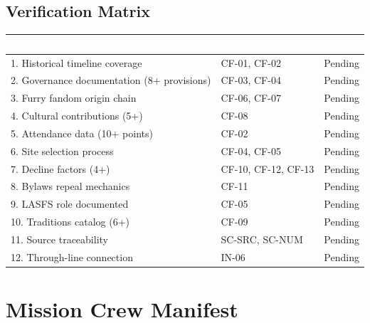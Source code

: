 \documentclass[11pt,letterpaper]{article}
\newcommand{\tableheader}[1]{\textbf{\sffamily\textcolor{white}{#1}}}
\begin{document}
\subsection{Verification Matrix}

\begin{center}
\begin{tabularx}{\textwidth}{XL{3.5cm}C{1.5cm}}
\toprule
{}
\tableheader{Success Criterion} & \tableheader{Test ID(s)} & \tableheader{Status} \\
. Historical timeline coverage & CF-01, CF-02 & Pending \\
2. Governance documentation (8+ provisions) & CF-03, CF-04 & Pending \\
3. Furry fandom origin chain & CF-06, CF-07 & Pending \\
4. Cultural contributions (5+) & CF-08 & Pending \\
5. Attendance data (10+ points) & CF-02 & Pending \\
6. Site selection process & CF-04, CF-05 & Pending \\
7. Decline factors (4+) & CF-10, CF-12, CF-13 & Pending \\
8. Bylaws repeal mechanics & CF-11 & Pending \\
9. LASFS role documented & CF-05 & Pending \\
10. Traditions catalog (6+) & CF-09 & Pending \\
11. Source traceability & SC-SRC, SC-NUM & Pending \\
12. Through-line connection & IN-06 & Pending \\
\bottomrule
\end{tabularx}
\end{center}

\section{Mission Crew Manifest}
\end{document}

